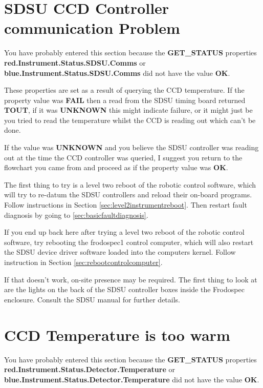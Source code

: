 \documentclass[10pt,a4paper]{article}
\begin{document}
\section{SDSU CCD Controller communication Problem}
\label{sec:sdsucommsproblem}

You have probably entered this section because the {\bf GET\_STATUS} properties {\bf red.Instrument.Status.SDSU.Comms} or  {\bf blue.Instrument.Status.SDSU.Comms} did not have the value {\bf OK}.

These properties are set as a result of querying the CCD temperature. If the property value was {\bf FAIL} then a read from the SDSU timing board returned {\bf TOUT}, if it was {\bf UNKNOWN} this might indicate failure, or it might just be you tried to read the temperature whilst the CCD is reading out which can't be done.

If the value was {\bf UNKNOWN} and you believe the SDSU controller was reading out at the time the CCD controller was queried, I suggest you return to the flowchart you came from and proceed as if the property value was  {\bf OK}.

The first thing to try is a level two reboot of the robotic control software, which will try to re-datum the SDSU controllers and reload their on-board programs. Follow instructions in Section \ref{sec:level2instrumentreboot}. Then
restart fault diagnosis by going to \ref{sec:basicfaultdiagnosis}.

If you end up back here after trying a level two reboot of the robotic control software, try rebooting
the frodospec1 control computer, which will also restart the SDSU device driver software loaded into the computers kernel. Follow instruction in Section \ref{sec:rebootcontrolcomputer}. 

If that doesn't work, on-site presence may be required. The first thing to look at are the lights on the back of the
SDSU controller boxes inside the Frodospec enclosure. Consult the SDSU manual for further details.

\section{CCD Temperature is too warm}
\label{sec:ccdtempwarm}

You have probably entered this section because the {\bf GET\_STATUS} properties {\bf red.Instrument.Status.Detector.Temperature} or {\bf  blue.Instrument.Status.Detector.Temperature} did not have the value {\bf OK}.
\end{document}
